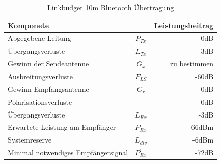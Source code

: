 \begin{table}[h]
  \centering
  \begin{tabular}{l c r} \toprule 
  Komponete                  	& 			&Leistungsbeitrag  \\ \midrule
  Abgegebene Leitung    			&$P_{Tx}$ 	& 0dB       \\
  Übergangsverluste              &$L_{Tx}$	& -3dB       \\
  Gewinn der Sendeantenne    	&$G_{x}$		& zu bestimmen        \\
  Ausbreitungsverluste   		& $F_{LS}$	& -60dB        \\
  Gewinn Empfangsantenne  		& $G_{r}$	& 0dB           \\
  Polarisationsverluste          & 	& 0dB            \\
  Übergangsverluste              & $L_{Rx}$	& -3dB            \\
  Erwartete Leistung am Empfänger & $P_{Rx}$  & -66dBm \cite{CC2541} \\ \midrule
  Systemreserve        			 & $L_{div}$&-6dBm \\ 
  Minimal notwendiges Empfängersignal &$P_{Rx}^{'}$ & -72dB \\ \bottomrule
  \end{tabular}
  \caption{Linkbudget 10m Bluetooth Übertragung}
  \label{tab:Linkbudget}
\end{table}
\newpage
